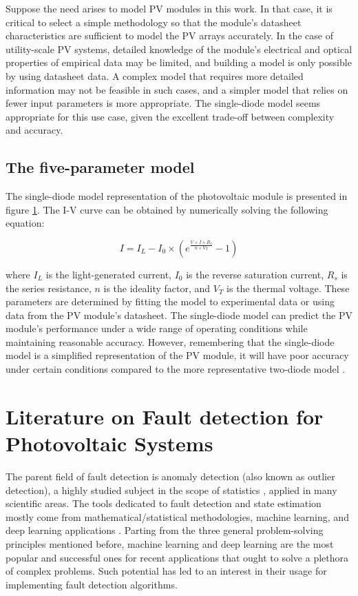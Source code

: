 Suppose the need arises to model PV modules in this work. In that case, it is critical to select a simple methodology so that the module's datasheet characteristics are sufficient to model the PV arrays accurately. In the case of utility-scale PV systems, detailed knowledge of the module's electrical and optical properties of empirical data may be limited, and building a model is only possible by using datasheet data. A complex model that requires more detailed information may not be feasible in such cases, and a simpler model that relies on fewer input parameters is more appropriate. The single-diode model seems appropriate for this use case, given the excellent trade-off between complexity and accuracy.

\subsection{The five-parameter model}

The single-diode model representation of the photovoltaic module is presented in figure \ref{}. The I-V curve can be obtained by numerically solving the following equation:

\begin{equation}
I = I_{L} - I_{0} \times (e^{\frac{V + I \times R_{s}}{n \times V_T}} - 1)
\end{equation}

where $I_{L}$ is the light-generated current, $I_{0}$ is the reverse saturation current, $R_{s}$ is the series resistance, $n$ is the ideality factor, and $V_{T}$ is the thermal voltage. These parameters are determined by fitting the model to experimental data or using data from the PV module's datasheet. The single-diode model can predict the PV module's performance under a wide range of operating conditions while maintaining reasonable accuracy. However, remembering that the single-diode model is a simplified representation of the PV module, it will have poor accuracy under certain conditions compared to the more representative two-diode model \cite{Godina2017}.


\section{Literature on Fault detection for Photovoltaic Systems}

The parent field of fault detection is anomaly detection (also known as outlier detection), a highly studied subject in the scope of statistics \cite{Prasad2009}, applied in many scientific areas. The tools dedicated to fault detection and state estimation mostly come from mathematical/statistical methodologies, machine learning, and deep learning applications \cite{AIPV}. Parting from the three general problem-solving principles mentioned before, machine learning and deep learning are the most popular and successful ones for recent applications that ought to solve a plethora of complex problems. Such potential has led to an interest in their usage for implementing fault detection algorithms.

